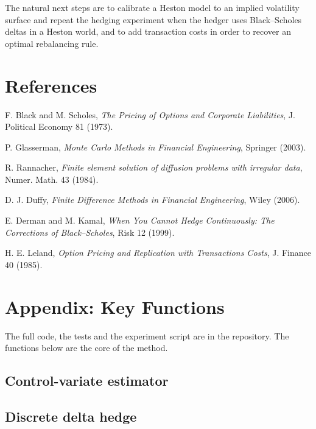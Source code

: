 \documentclass[11pt,a4paper,oneside]{report}
\begin{document}
The natural next steps are to calibrate a Heston model to an implied volatility surface and repeat the hedging experiment when the hedger uses Black--Scholes deltas in a Heston world, and to add transaction costs in order to recover an optimal rebalancing rule.

\chapter*{References}
\begin{enumerate}[label={[\arabic*]},leftmargin=2em]
\item F. Black and M. Scholes, \emph{The Pricing of Options and Corporate Liabilities}, J. Political Economy 81 (1973).
\item P. Glasserman, \emph{Monte Carlo Methods in Financial Engineering}, Springer (2003).
\item R. Rannacher, \emph{Finite element solution of diffusion problems with irregular data}, Numer. Math. 43 (1984).
\item D. J. Duffy, \emph{Finite Difference Methods in Financial Engineering}, Wiley (2006).
\item E. Derman and M. Kamal, \emph{When You Cannot Hedge Continuously: The Corrections of Black--Scholes}, Risk 12 (1999).
\item H. E. Leland, \emph{Option Pricing and Replication with Transactions Costs}, J. Finance 40 (1985).
\end{enumerate}

\chapter*{Appendix: Key Functions}
The full code, the tests and the experiment script are in the repository. The functions below are the core of the method.

\section*{Control-variate estimator}


\section*{Discrete delta hedge}

\end{document}
